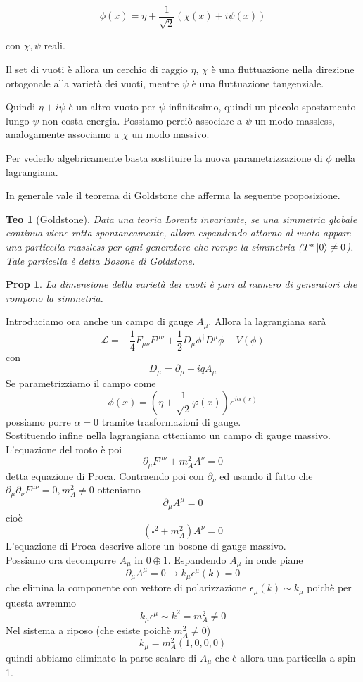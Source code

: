 \documentclass[10pt,a4paper]{article}
\newtheorem{thm}{Teo}[section]
\newtheorem{prop}{Prop}[section]
\theoremstyle{definition}
\begin{document}
\[
\phi(x) = \eta + \frac{1}{\sqrt{2}}\left(\chi(x) + i\psi(x)\right)    
\]

con $\chi, \psi$ reali.

Il set di vuoti è allora un cerchio di raggio $\eta$, $\chi$ è una fluttuazione nella direzione ortogonale alla varietà dei vuoti, mentre $\psi$ è una fluttuazione tangenziale.

Quindi $\eta + i \psi$ è un altro vuoto per $\psi$ infinitesimo, quindi un piccolo spostamento lungo $\psi$ non costa energia. Possiamo perciò associare a $\psi$ un modo massless, analogamente associamo a $\chi$ un modo massivo.

Per vederlo algebricamente basta sostituire la nuova parametrizzazione di $\phi$ nella lagrangiana.

In generale vale il teorema di Goldstone che afferma la seguente proposizione.

\begin{thm}[Goldstone]
    Data una teoria Lorentz invariante, se una simmetria globale continua viene rotta spontaneamente, allora espandendo attorno al vuoto appare una particella massless per ogni generatore che rompe la simmetria ($T^a\ket{0} \neq 0$). Tale particella è detta Bosone di Goldstone.
\end{thm}

\begin{prop}
    La dimensione della varietà dei vuoti è pari al numero di generatori che rompono la simmetria.
\end{prop}

Introduciamo ora anche un campo di gauge $A_\mu$. Allora la lagrangiana sarà
\[
\mathcal{L} = - \frac{1}{4} F_{\mu\nu}F^{\mu\nu} + \frac12 D_\mu\phi^\dagger D^\mu\phi - V(\phi)
\]
con 
\[
D_\mu = \partial_\mu + iqA_\mu    
\]
Se parametrizziamo il campo come 
\[
\phi(x) = (\eta + \frac{1}{\sqrt{2}} \varphi(x))e^{i\alpha(x)}    
\]
possiamo porre $\alpha = 0$ tramite trasformazioni di gauge.
\\
Sostituendo infine nella lagrangiana otteniamo un campo di gauge massivo.
\\
L'equazione del moto è poi 
\[
\partial_\mu F^{\mu\nu} + m_A^2 A^\nu = 0    
\]
detta equazione di Proca. Contraendo poi con $\partial_\nu$ ed usando il fatto che \(\partial_\mu \partial_\nu F^{\mu\nu} = 0, m^2_A \neq 0\) otteniamo
\[
\partial_\mu A^\mu = 0    
\]
cioè
\[
(\square^2 + m^2_A)A^\nu = 0    
\]
L'equazione di Proca descrive allore un bosone di gauge massivo.
\\
Possiamo ora decomporre $A_\mu$ in $0 \oplus 1$. Espandendo $A_\mu$ in onde piane 
\[
\partial_\mu A^\mu = 0 \longrightarrow k_\mu \epsilon^\mu(k) = 0    
\]
che elimina la componente con vettore di polarizzazione $\epsilon_\mu(k) \sim k_\mu$ poichè per questa avremmo
\[
k_\mu \epsilon^\mu  \sim k^2 = m^2_A \neq 0   
\]
Nel sistema a riposo (che esiste poichè $m^2_A \neq 0$)
\[
k_\mu = m^2_A (1, 0, 0, 0)    
\]
quindi abbiamo eliminato la parte scalare di $A_\mu$ che è allora una particella a spin 1.
\end{document}
